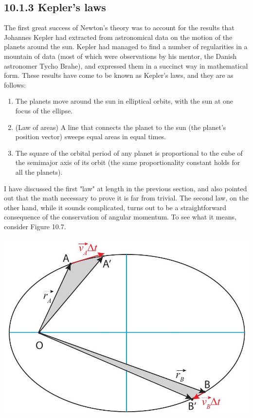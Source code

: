\documentclass[10pt]{article}
\begin{document}
\subsection*{10.1.3 Kepler's laws}
The first great success of Newton's theory was to account for the results that Johannes Kepler had extracted from astronomical data on the motion of the planets around the sun. Kepler had managed to find a number of regularities in a mountain of data (most of which were observations by his mentor, the Danish astronomer Tycho Brahe), and expressed them in a succinct way in mathematical form. These results have come to be known as Kepler's laws, and they are as follows:

\begin{enumerate}
  \item The planets move around the sun in elliptical orbits, with the sun at one focus of the ellipse.
  \item (Law of areas) A line that connects the planet to the sun (the planet's position vector) sweeps equal areas in equal times.
  \item The square of the orbital period of any planet is proportional to the cube of the semimajor axis of its orbit (the same proportionality constant holds for all the planets).
\end{enumerate}

I have discussed the first "law" at length in the previous section, and also pointed out that the math necessary to prove it is far from trivial. The second law, on the other hand, while it sounds complicated, turns out to be a straightforward consequence of the conservation of angular momentum. To see what it means, consider Figure 10.7.

\begin{center}
\includegraphics[max width=\textwidth]{2024_09_14_9969b06773f10b6936e8g-251}
\end{center}
\end{document}
